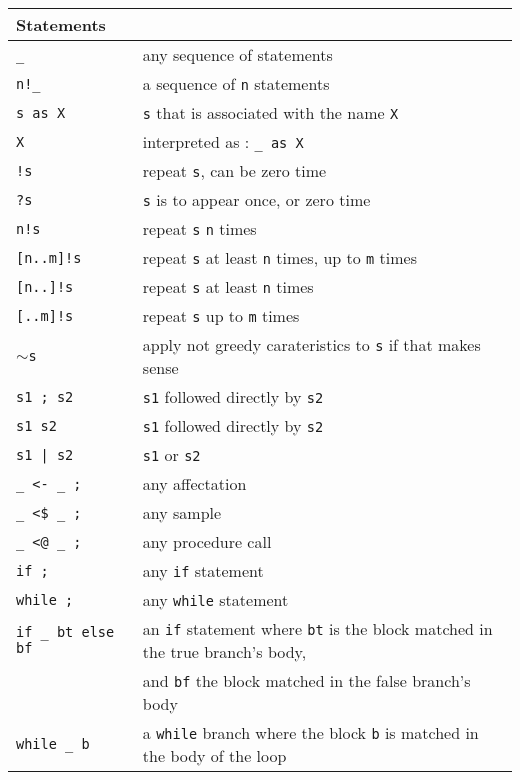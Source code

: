 \begin{tabular}{| l | l |}
  \hline
  Statements&\\
  \hline
  \texttt{\_} & any sequence of statements \\
  \texttt{n!\_} & a sequence of  \texttt{n} statements \\
  \texttt{s as X} &  \texttt{s} that is associated with the name  \texttt{X}\\
  \texttt{X} & interpreted as : \texttt{\_ as X} \\
  \hline
  \texttt{!s} & repeat  \texttt{s}, can be zero time \\
  \texttt{?s} &  \texttt{s} is to appear once, or zero time \\
  \texttt{n!s} & repeat  \texttt{s}  \texttt{n} times \\
  \texttt{[n..m]!s} & repeat  \texttt{s} at least  \texttt{n} times, up to  \texttt{m} times \\
  \texttt{[n..]!s} & repeat  \texttt{s} at least  \texttt{n} times \\
  \texttt{[..m]!s} & repeat  \texttt{s} up to  \texttt{m} times \\
  \texttt{$\sim$s} & apply not greedy carateristics to  \texttt{s} if that makes sense\\
  \hline
  \texttt{s1 ; s2} &  \texttt{s1} followed directly by  \texttt{s2} \\
  \texttt{s1 s2} &  \texttt{s1} followed directly by  \texttt{s2} \\
  \texttt{s1 | s2} &  \texttt{s1} or  \texttt{s2} \\
  \hline
  \texttt{\_ <- \_ ;} & any affectation \\
  \texttt{\_ <\$ \_ ;} & any sample \\
  \texttt{\_ <@ \_ ;} & any procedure call \\
  \texttt{if ;} & any  \texttt{if} statement \\
  \texttt{while ;} & any  \texttt{while} statement \\
  \texttt{if \_ bt else bf} & an \texttt{if} statement where  \texttt{bt} is the
  block matched in the true branch's body,\\
  & and \texttt{bf} the block matched in the false branch's body\\
  \texttt{while \_ b} & a \texttt{while} branch where the block  \texttt{b}
  is matched in the body of the loop\\
  \hline
\end{tabular}




